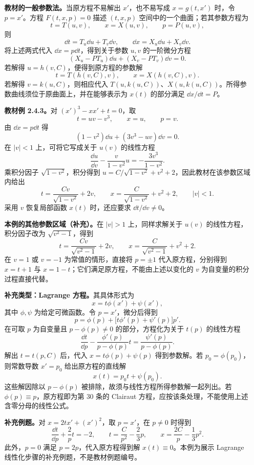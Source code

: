 \textbf{教材的一般参数法。}当原方程不易解出 $x'$，也不易写成 $x=g(t,x')$ 时，令 $p=x'$。方程 $F(t,x,p)=0$ 描述 $(t,x,p)$ 空间中的一个曲面；若其参数方程为
\[
t=T(u,v),\qquad x=X(u,v),\qquad p=P(u,v),
\]
则
\[
\dd t=T_u\dd u+T_v\dd v,\qquad
\dd x=X_u\dd u+X_v\dd v.
\]
将上述两式代入 $\dd x=p\dd t$，得到关于参数 $u,v$ 的一阶微分方程
\[
\boxed{(X_u-PT_u)\dd u+(X_v-PT_v)\dd v=0.}
\]
若解得 $u=h(v,C)$，便得到原方程的参数解
\[
t=T(h(v,C),v),\qquad x=X(h(v,C),v).
\]
若解得 $v=k(u,C)$，则相应代入 $T(u,k(u,C))$、$X(u,k(u,C))$。所得参数曲线须位于原曲面上，并在能够表示为 $x(t)$ 的部分满足 $\dd x/\dd t=P$。

\textbf{教材例 2.4.3。}对 $(x')^3-xx'+t=0$，取
\[
t=uv-v^3,\qquad x=u,\qquad p=v.
\]
由 $\dd x=p\dd t$ 得
\[
(1-v^2)\dd u+(3v^3-uv)\dd v=0.
\]
在 $|v|<1$ 上，可将它写成关于 $u(v)$ 的线性方程
\[
\frac{\dd u}{\dd v}-\frac{v}{1-v^2}u=-\frac{3v^3}{1-v^2}.
\]
乘积分因子 $\sqrt{1-v^2}$，积分得到 $u=C/\sqrt{1-v^2}+v^2+2$，因此教材在该参数区域内给出
\[
\boxed{t=\frac{Cv}{\sqrt{1-v^2}}+2v,\qquad
x=\frac{C}{\sqrt{1-v^2}}+v^2+2,\qquad |v|<1.}
\]
采用 $v$ 恢复局部函数 $x(t)$ 时，还应要求 $\dd t/\dd v\ne0$。

\textbf{本例的其他参数区域（补充）。}在 $|v|>1$ 上，同样求解关于 $u(v)$ 的线性方程，积分因子改为 $\sqrt{v^2-1}$，得到
\[
t=\frac{Cv}{\sqrt{v^2-1}}+2v,\qquad
x=\frac{C}{\sqrt{v^2-1}}+v^2+2.
\]
在 $v=1$ 或 $v=-1$ 为常值的情形，直接将 $p=\pm1$ 代入原方程，分别得到 $x=t+1$ 与 $x=1-t$；它们满足原方程，不能由上述以变化的 $v$ 为自变量的积分过程直接代替。

\textbf{补充类型：Lagrange 方程。}其具体形式为
\[
\boxed{x=t\phi(x')+\psi(x'),}
\]
其中 $\phi,\psi$ 为给定可微函数。令 $p=x'$，微分后得到
\[
p=\phi(p)+\bigl[t\phi'(p)+\psi'(p)\bigr]p'.
\]
在可取 $p$ 为自变量且 $p-\phi(p)\ne0$ 的部分，方程化为关于 $t(p)$ 的线性方程
\[
\boxed{\frac{\dd t}{\dd p}-\frac{\phi'(p)}{p-\phi(p)}t
=\frac{\psi'(p)}{p-\phi(p)}.}
\]
解出 $t=t(p,C)$ 后，代入 $x=t\phi(p)+\psi(p)$ 得到参数解。若 $p_0=\phi(p_0)$，则常数导数 $x'=p_0$ 给出原方程的直线解
\[
x(t)=p_0t+\psi(p_0).
\]
这些解因除以 $p-\phi(p)$ 被排除，故须与线性方程所得参数解一起列出。若 $\phi(p)\equiv p$，原方程即为第 30 条的 Clairaut 方程，应按该条处理，不能使用上述含零分母的线性公式。

\textbf{补充例题。}对 $x=2tx'+(x')^2$，取 $p=x'$，在 $p\ne0$ 时得到
\[
\frac{\dd t}{\dd p}+\frac2p t=-2,\qquad
\boxed{t=\frac C{p^2}-\frac23p,\qquad x=\frac{2C}{p}-\frac13p^2.}
\]
此外，$p=0$ 满足 $p=2p$，代入原方程得到解 $x(t)\equiv0$。本例为展示 Lagrange 线性化步骤的补充例题，不是教材例题编号。

